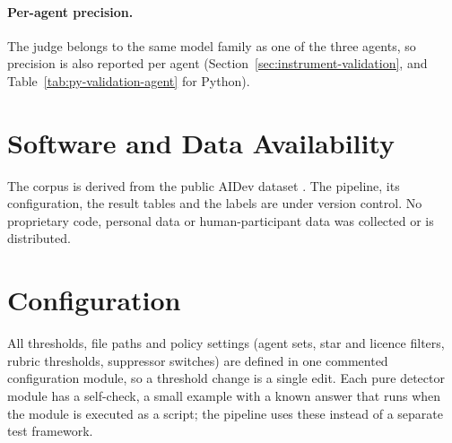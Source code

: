 \paragraph{Per-agent precision.} The judge belongs to the same model family as one of the three
agents, so precision is also reported per agent (Section~\ref{sec:instrument-validation}, and
Table~\ref{tab:py-validation-agent} for Python).

\section*{Software and Data Availability}

The corpus is derived from the public AIDev dataset \citep{li2025aidev}. The pipeline, its
configuration, the result tables and the labels are under version control. No proprietary code,
personal data or human-participant data was collected or is distributed.

\section*{Configuration}

All thresholds, file paths and policy settings (agent sets, star and licence filters, rubric
thresholds, suppressor switches) are defined in one commented configuration module, so a threshold
change is a single edit. Each pure detector module has a self-check, a small example with a known
answer that runs when the module is executed as a script; the pipeline uses these instead of a
separate test framework.

